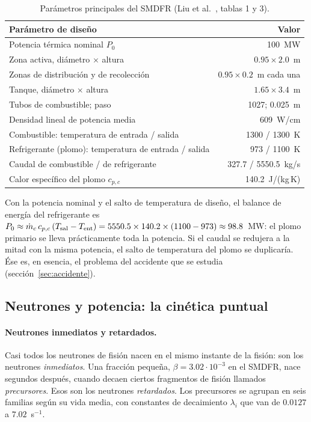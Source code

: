 \begin{table}[H]\centering\small
\begin{tabularx}{\linewidth}{@{}Y r@{}}\toprule
Parámetro de diseño & Valor\\\midrule
Potencia térmica nominal $P_0$ & 100~MW\\
Zona activa, diámetro $\times$ altura & $0.95\times2.0$~m\\
Zonas de distribución y de recolección & $0.95\times0.2$~m cada una\\
Tanque, diámetro $\times$ altura & $1.65\times3.4$~m\\
Tubos de combustible; paso & 1027; 0.025~m\\
Densidad lineal de potencia media & 609~W/cm\\
Combustible: temperatura de entrada / salida & 1300 / 1300~K\\
Refrigerante (plomo): temperatura de entrada / salida & 973 / 1100~K\\
Caudal de combustible / de refrigerante & 327.7 / 5550.5~kg/s\\
Calor específico del plomo $c_{p,c}$ & 140.2~J/(kg\,K)\\\bottomrule
\end{tabularx}
\caption{Parámetros principales del SMDFR (Liu et al.~\cite{liu2021}, tablas 1 y 3).}
\end{table}

\begin{ejemplo}
Con la potencia nominal y el salto de temperatura de diseño, el balance de energía del
refrigerante es $P_0\approx\dot m_c\,c_{p,c}\,(T_{\rm sal}-T_{\rm ent})=5550.5\times140.2\times(1100-973)
\approx98.8$~MW: el plomo primario se lleva prácticamente toda la potencia. Si el caudal se
redujera a la mitad con la misma potencia, el salto de temperatura del plomo se duplicaría.
Ése es, en esencia, el problema del accidente que se estudia (sección~\ref{sec:accidente}).
\end{ejemplo}

\subsection{Neutrones y potencia: la cinética puntual}
\paragraph{Neutrones inmediatos y retardados.} Casi todos los neutrones de fisión nacen en el
mismo instante de la fisión: son los neutrones \emph{inmediatos}. Una fracción pequeña,
$\beta=3.02\cdot10^{-3}$ en el SMDFR, nace segundos después, cuando decaen ciertos fragmentos
de fisión llamados \emph{precursores}. Esos son los neutrones \emph{retardados}. Los
precursores se agrupan en seis familias según su vida media, con constantes de decaimiento
$\lambda_i$ que van de $0.0127$ a $7.02$~s$^{-1}$.

